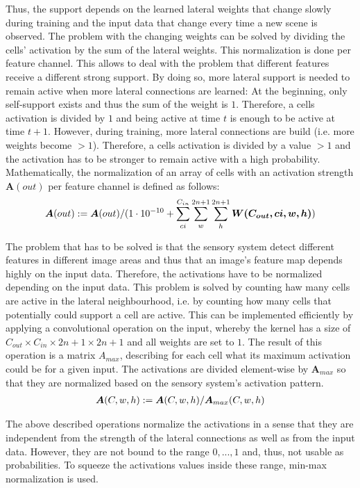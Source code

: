 Thus, the support depends on the learned lateral weights that change slowly during training and the input data that change every time a new scene is observed.
The problem with the changing weights can be solved by dividing the cells' activation by the sum of the lateral weights.
This normalization is done per feature channel. This allows to deal with the problem that different features receive a different strong support.
By doing so, more lateral support is needed to remain active when more lateral connections are learned: At the beginning, only self-support exists and thus the sum of the weight is $1$. Therefore, a cells activation is divided by $1$ and being active at time $t$ is enough to be active at time $t+1$.
However, during training, more lateral connections are build (i.e. more weights become $>1$). Therefore, a cells activation is divided by a value $>1$ and the activation has to be stronger to remain active with a high probability.
Mathematically, the normalization of an array of cells with an activation strength $\boldsymbol{A}(out)$ per feature channel is defined as follows:
\begin{align}\eqlbl{norm_lat}
	\boldsymbol{A}(out) :=  \boldsymbol{A}(out) / (1\cdot 10^{-10} + \sum_{ci}^{C_{in}}\sum_{w}^{2n+1}\sum_{h}^{2n+1} \boldsymbol{W(C_{out},ci,w,h)})
\end{align}

The problem that has to be solved is that the sensory system detect different features in different image areas and thus that an image's feature map depends highly on the input data. Therefore, the activations have to be normalized depending on the input data. This problem is solved by counting haw many cells are active in the lateral neighbourhood, i.e. by counting how many cells that potentially could support a cell are active.
This can be implemented efficiently by applying a convolutional operation on the input, whereby the kernel has a size of $C_{out} \times C_{in} \times 2n+1 \times 2n+1$ and all weights are set to $1$. The result of this operation is a matrix $A_{max}$, describing for each cell what its maximum activation could be for a given input.
The activations are divided element-wise by $\boldsymbol{A}_{max}$ so that they are normalized based on the sensory system's activation pattern.
\begin{align}\eqlbl{norm_lat2}
	\boldsymbol{A}(C,w,h) :=  \boldsymbol{A}(C,w,h) / \boldsymbol{A}_{max}(C,w,h)
\end{align}

The above described operations normalize the activations in a sense that they are independent from the strength of the lateral connections as well as from the input data. However, they are not bound to the range $0, ..., 1$ and, thus, not usable as probabilities.
To squeeze the activations values inside these range, min-max normalization is used.  

